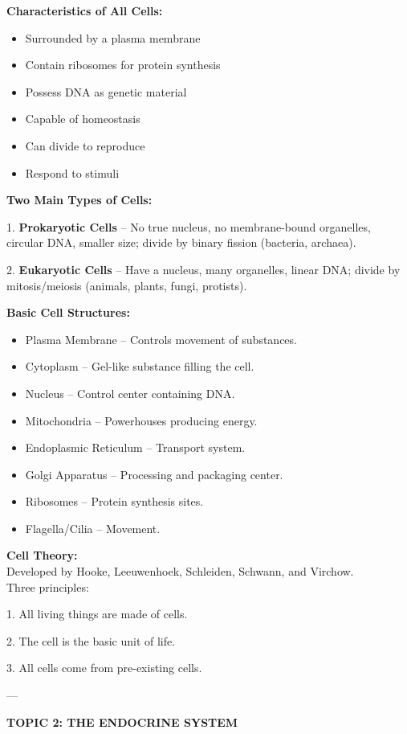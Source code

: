 {{\textbf{Characteristics of All Cells:}
\begin{itemize}
    \item Surrounded by a plasma membrane
    \item Contain ribosomes for protein synthesis
    \item Possess DNA as genetic material
    \item Capable of homeostasis
    \item Can divide to reproduce
    \item Respond to stimuli
\end{itemize}

\textbf{Two Main Types of Cells:}

1. \textbf{Prokaryotic Cells} – No true nucleus, no membrane-bound organelles, circular DNA, smaller size; divide by binary fission (bacteria, archaea).

2. \textbf{Eukaryotic Cells} – Have a nucleus, many organelles, linear DNA; divide by mitosis/meiosis (animals, plants, fungi, protists).

\textbf{Basic Cell Structures:}
\begin{itemize}
    \item Plasma Membrane – Controls movement of substances.
    \item Cytoplasm – Gel-like substance filling the cell.
    \item Nucleus – Control center containing DNA.
    \item Mitochondria – Powerhouses producing energy.
    \item Endoplasmic Reticulum – Transport system.
    \item Golgi Apparatus – Processing and packaging center.
    \item Ribosomes – Protein synthesis sites.
    \item Flagella/Cilia – Movement.
\end{itemize}

\textbf{Cell Theory:}\\
Developed by Hooke, Leeuwenhoek, Schleiden, Schwann, and Virchow.\\
Three principles:

1. All living things are made of cells.

2. The cell is the basic unit of life.

3. All cells come from pre-existing cells.

---

\textbf{TOPIC 2: THE ENDOCRINE SYSTEM}

}}
